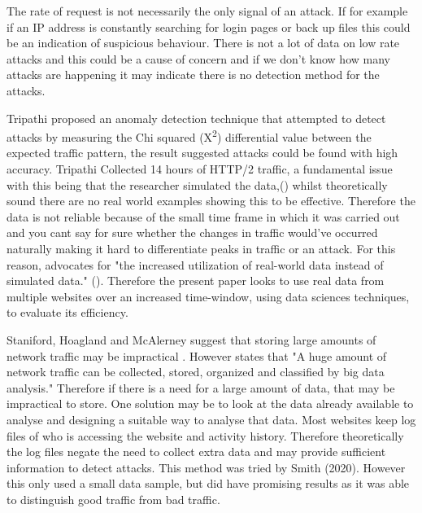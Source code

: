 The rate of request is not necessarily the only signal of an attack. If for example if an IP address is constantly searching for login pages or back up files this could be an indication of suspicious behaviour. There is not a lot of data on low rate attacks and this could be a cause of concern and if we don't know how many attacks are happening it may indicate there is no detection method for the attacks. 

 
 Tripathi proposed an anomaly detection technique that attempted to detect attacks by measuring the Chi squared (X\textsuperscript{\small2}) differential value between the expected traffic pattern, the result suggested attacks could be found with high accuracy. Tripathi Collected 14 hours of HTTP/2 traffic, a fundamental issue with this being that the researcher simulated the data,(\cite{tripathi2018slow}) whilst theoretically sound there are no real world examples showing this to be effective. Therefore the data is not reliable because of the small time frame in which it was carried out and you cant say for sure whether the changes in traffic would've occurred naturally making it hard to differentiate peaks in traffic or an attack. For this reason, \citeauthor{8500383} advocates for "the increased utilization of real-world data instead of simulated data." (\cite{8500383}). Therefore the present paper looks to use real data from multiple websites over an increased time-window, using data sciences techniques, to evaluate its efficiency. 

Staniford, Hoagland and McAlerney suggest that storing large amounts of network traffic may be impractical \cite{staniford2002practical}. However \citeauthor{9016229} states that "A huge amount of network traffic can be collected, stored, organized and classified by big data analysis." \cite{9016229} Therefore if there is a need for a large amount of data, that may be impractical to store. One solution may be to look at the data already available to analyse and designing a suitable way to analyse that data. Most websites keep log files of who is accessing the website and activity history. Therefore theoretically the log files negate the need to collect extra data and may provide sufficient information to detect attacks. This method was tried by Smith (2020). However this only used a small data sample, but did have promising results as it was able to distinguish good traffic from bad traffic. 

